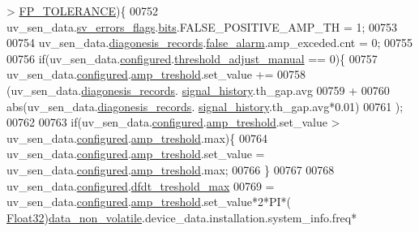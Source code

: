 \begin{DoxyCode}
      > \hyperlink{a00017_a946f0acff4fd16a65859479e9e0b9513}{FP\_TOLERANCE})\{
00752                   uv\_sen\_data.\hyperlink{a00035_aaeec6b0609dba31393f337abf1cce3d3}{sv\_errors\_flags}.\hyperlink{a00022_ab81eb6fb4f1351ed07b4d6c4dd6f1959}{bits}.FALSE\_POSITIVE\_AMP\_TH = 1;
00753 
00754                   uv\_sen\_data.\hyperlink{a00035_a7ae905b560513ad201e58c2f63375030}{diagonesis\_records}.\hyperlink{a00017_a799f50625c0c03f9404a59287810113d}{false\_alarm}.amp\_exceded.cnt =
       0;
00755 
00756                  \textcolor{keywordflow}{if}(uv\_sen\_data.\hyperlink{a00035_a94b2d1f6ea4ab334c74d24984dd27843}{configured}.\hyperlink{a00021_a18e270a10094f045f20299b0f7e83085}{threshold\_adjust\_manual} == 0)\{
00757                          uv\_sen\_data.\hyperlink{a00035_a94b2d1f6ea4ab334c74d24984dd27843}{configured}.\hyperlink{a00021_a4b3bbfb0267daea1432f2603825ade62}{amp\_treshold}.set\_value  +=
00758                          (uv\_sen\_data.\hyperlink{a00035_a7ae905b560513ad201e58c2f63375030}{diagonesis\_records}.
      \hyperlink{a00017_affb63906d23cb1cb7787d61eaaedfb60}{signal\_history}.th\_gap.avg
00759                           +
00760                          abs(uv\_sen\_data.\hyperlink{a00035_a7ae905b560513ad201e58c2f63375030}{diagonesis\_records}.
      \hyperlink{a00017_affb63906d23cb1cb7787d61eaaedfb60}{signal\_history}.th\_gap.avg*0.01)
00761                          );
00762 
00763                          \textcolor{keywordflow}{if}(uv\_sen\_data.\hyperlink{a00035_a94b2d1f6ea4ab334c74d24984dd27843}{configured}.\hyperlink{a00021_a4b3bbfb0267daea1432f2603825ade62}{amp\_treshold}.set\_value > 
      uv\_sen\_data.\hyperlink{a00035_a94b2d1f6ea4ab334c74d24984dd27843}{configured}.\hyperlink{a00021_a4b3bbfb0267daea1432f2603825ade62}{amp\_treshold}.max)\{
00764                              uv\_sen\_data.\hyperlink{a00035_a94b2d1f6ea4ab334c74d24984dd27843}{configured}.\hyperlink{a00021_a4b3bbfb0267daea1432f2603825ade62}{amp\_treshold}.set\_value = 
      uv\_sen\_data.\hyperlink{a00035_a94b2d1f6ea4ab334c74d24984dd27843}{configured}.\hyperlink{a00021_a4b3bbfb0267daea1432f2603825ade62}{amp\_treshold}.max;
00766                          \}
00767 
00768                       uv\_sen\_data.\hyperlink{a00035_a94b2d1f6ea4ab334c74d24984dd27843}{configured}.\hyperlink{a00021_adf9a37828e447378b1d533185213316d}{dfdt\_treshold\_max}
00769                         = uv\_sen\_data.\hyperlink{a00035_a94b2d1f6ea4ab334c74d24984dd27843}{configured}.\hyperlink{a00021_a4b3bbfb0267daea1432f2603825ade62}{amp\_treshold}.set\_value*2*PI*(
      \hyperlink{a00072_a87d38f886e617ced2698fc55afa07637}{Float32})\hyperlink{a00060_a76ac5f917f5308dcd83de0d7c94559fb}{data\_non\_volatile}.device\_data.installation.system\_info.freq*

\end{DoxyCode}

